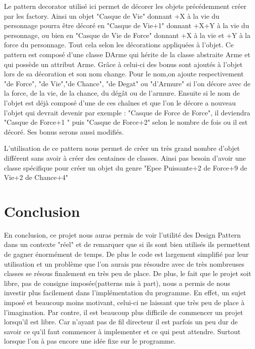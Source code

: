 \documentclass[a4paper]{article}
\begin{document}
Le pattern decorator utilisé ici permet de décorer les objets précédemment créer par les factory. Ainsi un objet "Casque de Vie" donnant +X à la vie
du personnage pourra être décoré en "Casque de Vie+1" donnant +X+Y à la vie du personnage, ou bien en "Casque de Vie de Force" donnant +X à la vie 
et +Y à la force du personnage. Tout cela selon les décorations appliquées à l'objet.
Ce pattern est composé d'une classe DArme qui hérite de la classe abstraite Arme et qui possède un attribut Arme. Grâce à celui-ci des bonus sont ajoutés à l'objet lors de sa décoration et son nom change. Pour le nom,on ajoute respectivement "de Force", "de Vie","de Chance", "de Degat" ou "d'Armure" si l'on décore avec de la force, de la vie, de la chance, du dégât ou de l'armure. Ensuite si le nom de l'objet est déjà composé d'une de ces chaînes et que l'on le décore a nouveau l'objet qui devrait devenir par exemple :
"Casque de Force de Force", il deviendra "Casque de Force+1 " puis "Casque de Force+2" selon le nombre de fois ou il est décoré. Ses bonus serons aussi modifiés.

L'utilisation de ce pattern nous permet de créer un très grand nombre d'objet différent sans avoir à créer des centaines de classes. Ainsi pas besoin d'avoir une classe spécifique pour créer un objet du genre "Epee Puissante+2 de Force+9 de Vie+2 de Chance+4"

 
 \section{Conclusion}
 
    En conclusion, ce projet nous auras permis de voir l'utilité des Design Pattern dans un contexte "réel" et de remarquer que si ils sont bien utilisés ils permettent de gagner énormément de temps. De plus le code est largement simplifié par leur utilisation et un problème que l'on aurais pus résoudre avec de très nombreuses classes se résous finalement en très peu de place.
De plus, le fait que le projet soit libre, pas de consigne imposée(patterns mis à part), nous a permis de nous investir plus facilement dans l'implémentation du programme.
En effet, un sujet imposé et beaucoup moins motivant, celui-ci ne laissant que très peu de place à l'imagination.
Par contre, il est beaucoup plus difficile de commencer un projet lorsqu'il est libre. Car n'ayant pas de fil directeur il est parfois un peu dur de savoir ce qu'il faut
commencer à implementer et ce qui peut attendre. Surtout lorsque l'on à pas encore une idée fixe sur le programme.
\end{document}
